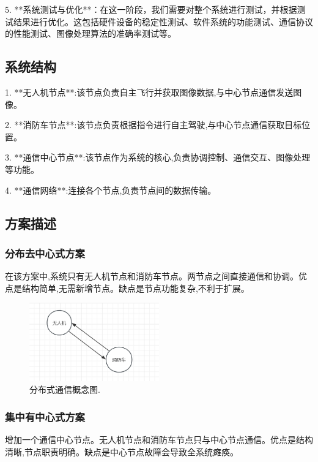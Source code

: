 \documentclass[12pt, a4paper, oneside]{article}
\begin{document}
5. **系统测试与优化**：在这一阶段，我们需要对整个系统进行测试，并根据测试结果进行优化。这包括硬件设备的稳定性测试、软件系统的功能测试、通信协议的性能测试、图像处理算法的准确率测试等。

\subsection{系统结构}

1. **无人机节点**:该节点负责自主飞行并获取图像数据,与中心节点通信发送图像。

2. **消防车节点**:该节点负责根据指令进行自主驾驶,与中心节点通信获取目标位置。

3. **通信中心节点**:该节点作为系统的核心,负责协调控制、通信交互、图像处理等功能。

4. **通信网络**:连接各个节点,负责节点间的数据传输。

\subsection{方案描述}

\subsubsection{分布去中心式方案}

在该方案中,系统只有无人机节点和消防车节点。两节点之间直接通信和协调。优点是结构简单,无需新增节点。缺点是节点功能复杂,不利于扩展。

\begin{figure}[H]
    \centering
    \includegraphics[width=0.5\textwidth]{image-6.png}
    \caption{分布式通信概念图.}
    \label{分布式通信概念图}
\end{figure}


\subsubsection{集中有中心式方案}

增加一个通信中心节点。无人机节点和消防车节点只与中心节点通信。优点是结构清晰,节点职责明确。缺点是中心节点故障会导致全系统瘫痪。
\end{document}
